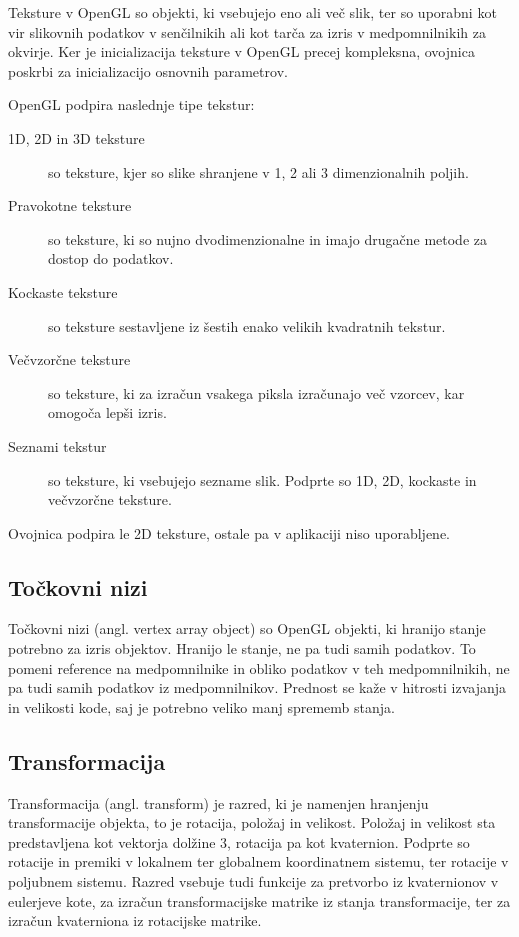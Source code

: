 \documentclass[a4paper, 12pt]{book}
\begin{document}
Teksture v OpenGL so objekti, ki vsebujejo eno ali več slik, ter so uporabni kot vir slikovnih podatkov v senčilnikih ali kot tarča za izris v medpomnilnikih za okvirje. Ker je inicializacija teksture v OpenGL precej kompleksna, ovojnica poskrbi za inicializacijo osnovnih parametrov.

OpenGL podpira naslednje tipe tekstur:

\begin{description}
\item [1D, 2D in 3D teksture]so teksture, kjer so slike shranjene v 1, 2 ali 3 dimenzionalnih poljih.
\item [Pravokotne teksture]so teksture, ki so nujno dvodimenzionalne in imajo drugačne metode za dostop do podatkov.
\item [Kockaste teksture]so teksture sestavljene iz šestih enako velikih kvadratnih tekstur.
\item [Večvzorčne teksture]so teksture, ki za izračun vsakega piksla izračunajo več vzorcev, kar omogoča lepši izris.
\item [Seznami tekstur]so teksture, ki vsebujejo sezname slik. Podprte so 1D, 2D, kockaste in večvzorčne teksture.
\end{description}

Ovojnica podpira le 2D teksture, ostale pa v aplikaciji niso uporabljene.

\subsection{Točkovni nizi}

Točkovni nizi (angl. vertex array object) so OpenGL objekti, ki hranijo stanje potrebno za izris objektov. Hranijo le stanje, ne pa tudi samih podatkov. To pomeni reference na medpomnilnike in obliko podatkov v teh medpomnilnikih, ne pa tudi samih podatkov iz medpomnilnikov. Prednost se kaže v hitrosti izvajanja in velikosti kode, saj je potrebno veliko manj sprememb stanja.

\subsection{Transformacija}

Transformacija (angl. transform) je razred, ki je namenjen hranjenju transformacije objekta, to je rotacija, položaj in velikost. Položaj in velikost sta predstavljena kot vektorja dolžine 3, rotacija pa kot kvaternion\cite{quaternion}. Podprte so rotacije in premiki v lokalnem ter globalnem koordinatnem sistemu, ter rotacije v poljubnem sistemu. Razred vsebuje tudi funkcije za pretvorbo iz kvaternionov v eulerjeve kote, za izračun transformacijske matrike iz stanja transformacije, ter za izračun kvaterniona iz rotacijske matrike.
\end{document}
